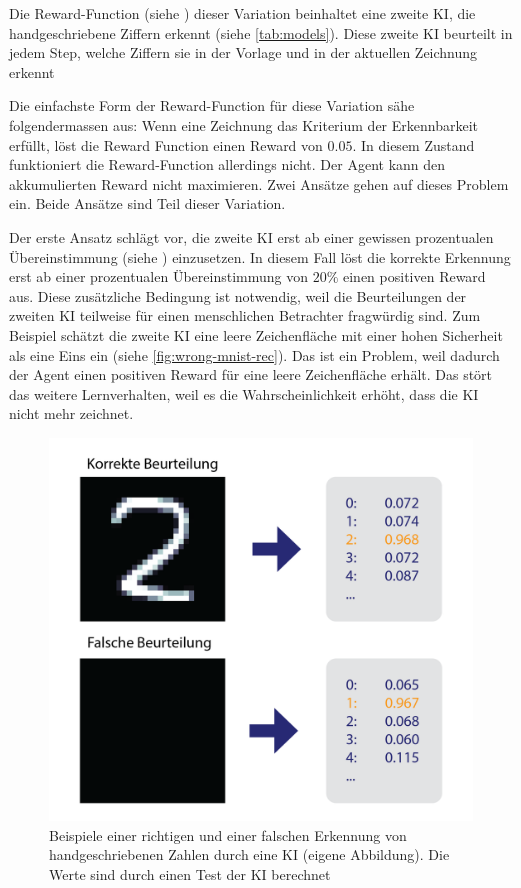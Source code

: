 Die Reward-Function (siehe ) dieser Variation beinhaltet
eine zweite KI, die handgeschriebene Ziffern erkennt (siehe
\autoref{tab:models}). Diese zweite KI beurteilt in jedem Step, welche
Ziffern sie in der Vorlage und in der aktuellen
Zeichnung erkennt
 
Die einfachste Form der Reward-Function für diese Variation sähe
folgendermassen aus: Wenn eine Zeichnung das Kriterium der Erkennbarkeit
erfüllt, löst die Reward Function einen Reward von $0.05$. In diesem Zustand
funktioniert die Reward-Function allerdings nicht. Der Agent kann den
akkumulierten Reward nicht maximieren. Zwei Ansätze gehen auf dieses Problem
ein. Beide Ansätze sind Teil dieser Variation.
 
Der erste Ansatz schlägt vor, die zweite KI erst ab einer gewissen prozentualen
Übereinstimmung (siehe ) einzusetzen. In diesem Fall
löst die korrekte Erkennung erst ab einer prozentualen Übereinstimmung von
$20\%$ einen positiven Reward aus. Diese zusätzliche Bedingung ist notwendig,
weil die Beurteilungen der zweiten KI teilweise für einen menschlichen
Betrachter fragwürdig sind. Zum Beispiel schätzt die zweite KI eine leere
Zeichenfläche mit einer hohen Sicherheit als eine Eins ein (siehe
\autoref{fig:wrong-mnist-rec}). Das ist ein Problem, weil dadurch der Agent
einen positiven Reward für eine leere Zeichenfläche erhält. Das stört das
weitere Lernverhalten, weil es die Wahrscheinlichkeit erhöht, dass die KI nicht
mehr zeichnet.
 
\begin{figure}[!ht]
 \centering
 \includegraphics[width=\textwidth]{images/methode/wrong-mnist-rec.png}
 \caption{Beispiele einer richtigen und einer falschen Erkennung von handgeschriebenen Zahlen durch eine KI (eigene Abbildung). Die Werte sind durch einen Test der KI berechnet}\label{fig:wrong-mnist-rec}
\end{figure}
 
